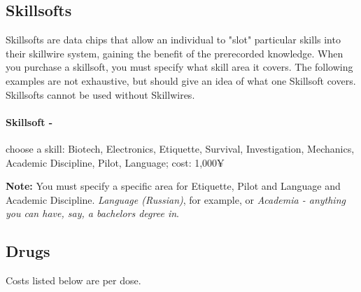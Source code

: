 \subsection{Skillsofts}
Skillsofts are data chips that allow an individual to "slot" particular skills into their \refname{skillwire} system, gaining the benefit of the prerecorded knowledge. When you purchase a skillsoft, you must specify what skill area it covers. The following examples are not exhaustive, but should give an idea of what one Skillsoft covers. Skillsofts cannot be used without Skillwires.

\paragraph{Skillsoft -} choose a skill: Biotech, Electronics, Etiquette, Survival, Investigation, Mechanics, Academic Discipline, Pilot, Language; cost: 1,000¥

\textbf{Note:} You must specify a specific area for Etiquette, Pilot and Language and Academic Discipline. \textit{Language (Russian)}, for example, or \textit{Academia - anything you can have, say, a bachelors degree in}.


\subsection{Drugs}
Costs listed below are per dose.



